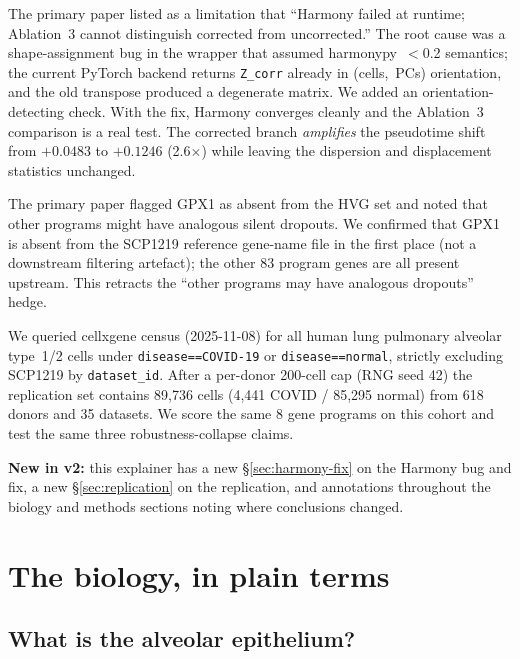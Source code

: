 \documentclass[11pt]{article}
\newcommand{\newin}[1]{\textcolor{newc}{\textbf{New in v2:} #1}}
\begin{document}
\begin{description}[style=nextline]
\item[(i) Harmony fix.] The primary paper listed as a limitation that
      ``Harmony failed at runtime; Ablation~3 cannot distinguish corrected from
      uncorrected.'' The root cause was a shape-assignment bug in the wrapper that
      assumed harmonypy~$<$0.2 semantics; the current PyTorch backend returns
      \texttt{Z\_corr} already in (cells,~PCs) orientation, and the old transpose
      produced a degenerate matrix. We added an orientation-detecting check. With the
      fix, Harmony converges cleanly and the Ablation~3 comparison is a real test.
      The corrected branch \emph{amplifies} the pseudotime shift from $+0.0483$ to
      $+0.1246$ (2.6$\times$) while leaving the dispersion and displacement statistics
      unchanged.
\item[(ii) Gene-program audit.] The primary paper flagged GPX1 as absent from the HVG
      set and noted that other programs might have analogous silent dropouts. We
      confirmed that GPX1 is absent from the SCP1219 reference gene-name file in the
      first place (not a downstream filtering artefact); the other 83 program genes are
      all present upstream. This retracts the ``other programs may have analogous
      dropouts'' hedge.
\item[(iii) Independent cross-cohort replication.] We queried cellxgene census
      (2025-11-08) for all human lung pulmonary alveolar type~1/2 cells under
      \texttt{disease==COVID-19} or \texttt{disease==normal}, strictly excluding SCP1219
      by \texttt{dataset\_id}. After a per-donor 200-cell cap (RNG seed 42) the
      replication set contains 89{,}736 cells (4{,}441 COVID / 85{,}295 normal) from
      618 donors and 35 datasets. We score the same 8 gene programs on this cohort and
      test the same three robustness-collapse claims.
\end{description}

\newin{this explainer has a new \S\ref{sec:harmony-fix} on the Harmony bug and fix, a
new \S\ref{sec:replication} on the replication, and annotations throughout the biology
and methods sections noting where conclusions changed.}

\section{The biology, in plain terms}

\subsection{What is the alveolar epithelium?}
\end{document}
